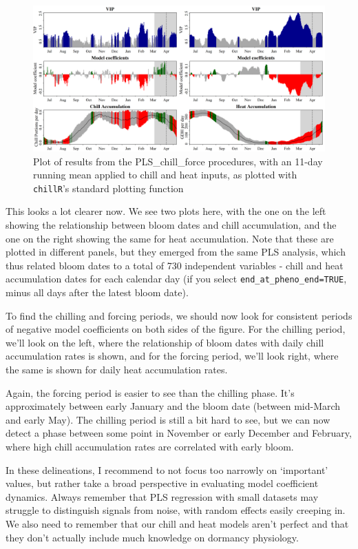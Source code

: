 \documentclass[
]{book}
\begin{document}
\begin{figure}
\centering
\includegraphics{pictures/plscf_11_days_Chill_Portions_GDH.png}
\caption{Plot of results from the PLS\_chill\_force procedures, with an 11-day running mean applied to chill and heat inputs, as plotted with \texttt{chillR}'s standard plotting function}
\end{figure}

This looks a lot clearer now. We see two plots here, with the one on the left showing the relationship between bloom dates and chill accumulation, and the one on the right showing the same for heat accumulation. Note that these are plotted in different panels, but they emerged from the same PLS analysis, which thus related bloom dates to a total of 730 independent variables - chill and heat accumulation dates for each calendar day (if you select \texttt{end\_at\_pheno\_end=TRUE}, minus all days after the latest bloom date).

To find the chilling and forcing periods, we should now look for consistent periods of negative model coefficients on both sides of the figure. For the chilling period, we'll look on the left, where the relationship of bloom dates with daily chill accumulation rates is shown, and for the forcing period, we'll look right, where the same is shown for daily heat accumulation rates.

Again, the forcing period is easier to see than the chilling phase. It's approximately between early January and the bloom date (between mid-March and early May). The chilling period is still a bit hard to see, but we can now detect a phase between some point in November or early December and February, where high chill accumulation rates are correlated with early bloom.

In these delineations, I recommend to not focus too narrowly on `important' values, but rather take a broad perspective in evaluating model coefficient dynamics. Always remember that PLS regression with small datasets may struggle to distinguish signals from noise, with random effects easily creeping in. We also need to remember that our chill and heat models aren't perfect and that they don't actually include much knowledge on dormancy physiology.
\end{document}
